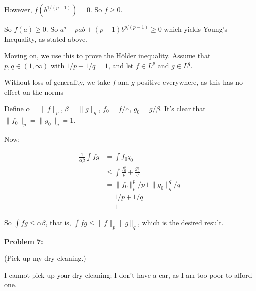 \documentclass[a4paper,12pt]{article}
\newcommand{\shunt}{\vspace{20mm}}
\newcommand{\norm}[1]{\|#1\|}
\newcommand{\al}{\alpha} %
\newcommand{\be}{\beta}
\begin{document}
However, $f(b^{1/(p-1)})=0$. So $f \geq 0$.

So $f(a) \geq 0$. So $a^p-pab+(p-1)b^{p/(p-1)} \geq 0$ which yields Young's Inequality, as stated above.

Moving on, we use this to prove the H{\"o}lder inequality. Assume that $p,q \in (1, \infty)$ with $1/p + 1/q = 1$, and let $f \in L^p$ and $g \in L^q$. 

Without loss of generality, we take $f$ and $g$ positive everywhere, as this has no effect on the norms. 

Define $\al = \norm{f}_p$, $\be = \norm{g}_q$, $f_0 = f/\al$, $g_0 = g/\be$. It's clear that $\norm{f_0}_p = \norm{g_0}_q = 1$. 

Now:

\begin{align*}
\frac{1}{\al \be} \int fg &= \int f_0 g_0 \\
&\leq \int \frac{f_0^p}{p} + \frac{g_0^q}{q}\\
&= \norm{f_0}_p^p/p + \norm{g_0}_q^q/q\\
&= 1/p + 1/q\\
&=1
\end{align*}

So $\int fg \leq \al \be$, that is, $\int fg \leq \norm{f}_p\norm{g}_q$, which is the desired result.

\shunt

{\bf Problem 7:}

(Pick up my dry cleaning.)

I cannot pick up your dry cleaning; I don't have a car, as I am too poor to afford one.

\shunt
\end{document}
